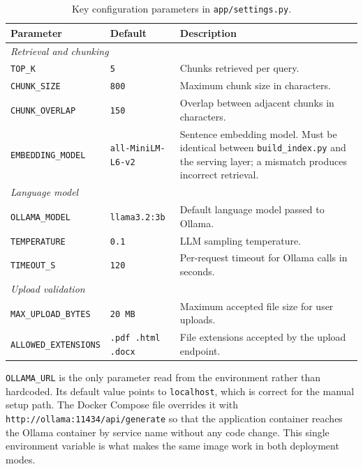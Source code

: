 \begin{table}[H]
    \centering
    \begin{tabular}{ | m{} | m{} | m{} | }
        \hline
        \textbf{Parameter} & \textbf{Default} & \textbf{Description} \\
        \hline \hline
        \multicolumn{3}{|l|}{\textit{Retrieval and chunking}} \\
        \hline
        \texttt{TOP\_K}        & \texttt{5}   & Chunks retrieved per query. \\
        \hline
        \texttt{CHUNK\_SIZE}   & \texttt{800} & Maximum chunk size in characters. \\
        \hline
        \texttt{CHUNK\_OVERLAP}& \texttt{150} & Overlap between adjacent chunks in characters. \\
        \hline
        \texttt{EMBEDDING\_MODEL} & \texttt{all-MiniLM-L6-v2} & Sentence embedding model. Must be identical between \texttt{build\_index.py} and the serving layer; a mismatch produces incorrect retrieval. \\
        \hline \hline
        \multicolumn{3}{|l|}{\textit{Language model}} \\
        \hline
        \texttt{OLLAMA\_MODEL} & \texttt{llama3.2:3b} & Default language model passed to Ollama. \\
        \hline
        \texttt{TEMPERATURE}   & \texttt{0.1} & LLM sampling temperature. \\
        \hline
        \texttt{TIMEOUT\_S}    & \texttt{120} & Per-request timeout for Ollama calls in seconds. \\
        \hline \hline
        \multicolumn{3}{|l|}{\textit{Upload validation}} \\
        \hline
        \texttt{MAX\_UPLOAD\_BYTES} & \texttt{20~MB} & Maximum accepted file size for user uploads. \\
        \hline
        \texttt{ALLOWED\_EXTENSIONS} & \texttt{.pdf .html .docx} & File extensions accepted by the upload endpoint. \\
        \hline
    \end{tabular}
    \caption{Key configuration parameters in \texttt{app/settings.py}.}
    \label{tab:settings}
\end{table}

\texttt{OLLAMA\_URL} is the only parameter read from the environment rather
than hardcoded. Its default value points to \texttt{localhost}, which is
correct for the manual setup path. The Docker Compose file overrides it with
\texttt{http://ollama:11434/api/generate} so that the application container
reaches the Ollama container by service name without any code change. This
single environment variable is what makes the same image work in both
deployment modes.

